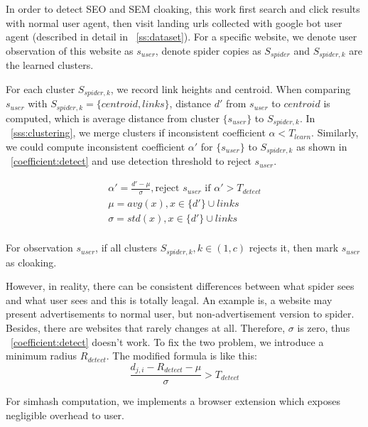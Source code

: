 In order to detect SEO and SEM cloaking,
this work first search and click results with normal user agent, then visit 
landing urls collected with google bot user agent (described in detail in
~\autoref{ss:dataset}).
For a specific website, we denote user observation of this website as
$s_{user}$, denote spider copies as $S_{spider}$ and 
$S_{spider, k}$ are the learned clusters.

For each cluster $S_{spider, k}$, we record link heights and centroid.
When comparing $s_{user}$ with $S_{spider, k} = \{centroid, links\}$, 
distance $d'$ from $s_{user}$ to $centroid$ is computed, which is average distance
from cluster $\{s_{user}\}$ to $S_{spider, k}$. In ~\autoref{sss:clustering}, we
merge clusters if inconsistent coefficient $\alpha < T_{learn}$. Similarly, we
could compute inconsistent coefficient $\alpha'$ for $\{s_{user}\}$ to $S_{spider, k}$ as
shown in ~\autoref{coefficient:detect} and use detection threshold to reject
$s_{user}$.

\begin{equation}
\label{coefficient:detect}
\begin{gathered}
  \alpha' = \frac{d' - \mu}{\sigma}, \text{reject } s_{user} \text{ if } \alpha' >
  T_{detect} \\
  \mu = avg(x), x \in  \{d'\} \cup links \\
  \sigma = std(x), x \in \{d'\} \cup links \\
\end{gathered}
\end{equation}

For observation $s_{user}$, if all clusters $S_{spider, k}, k \in (1, c)$ rejects it, then
mark $s_{user}$ as cloaking.

However, in reality, there can be consistent differences between what spider
sees and what user sees and this is totally leagal. An example is, a website may
present advertisements to normal user, but non-advertisement version to spider.
Besides, there are websites that rarely changes at all. Therefore, $\sigma$ is
zero, thus ~\autoref{coefficient:detect} doesn't work. To fix the two problem, we introduce
a minimum radius $R_{detect}$. The modified formula is like this:
\begin{equation}
  \label{radius:detect}
  \frac{d_{j,i} - R_{detect} - \mu}{\sigma} > T_{detect}
\end{equation}



For simhash computation, we implements a browser extension which exposes
negligible overhead to user.



